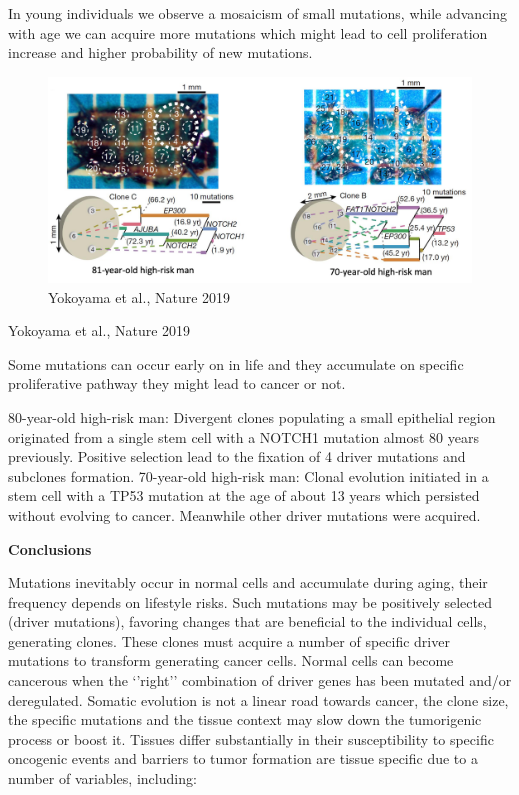In young individuals we observe a mosaicism of small mutations, while advancing with age we can acquire more mutations which might lead to cell proliferation increase and higher probability of new mutations.

\begin{figure}
\centering
\includegraphics{../_resources/Screen_Shot_2022-11-04_at_10-59-51.png}
\caption{Yokoyama et al., Nature 2019}
\end{figure}

Yokoyama et al., Nature 2019

Some mutations can occur early on in life and they accumulate on specific proliferative pathway they might lead to cancer or not.

80-year-old high-risk man: Divergent clones populating a small epithelial region originated from a single stem cell with a NOTCH1 mutation almost 80 years previously. Positive selection lead to the fixation of 4 driver mutations and subclones formation.
70-year-old high-risk man: Clonal evolution initiated in a stem cell with a TP53 mutation at the age of about 13 years which persisted without evolving to cancer. Meanwhile other driver mutations were acquired.

\textbf{Conclusions}

Mutations inevitably occur in normal cells and accumulate during aging, their frequency depends on lifestyle risks. Such mutations may be positively selected (driver mutations), favoring changes that are beneficial to the individual cells, generating clones. These clones must acquire a number of specific driver mutations to transform generating cancer cells. Normal cells can become cancerous when the `'right'' combination of driver genes has been mutated and/or deregulated. Somatic evolution is not a linear road towards cancer, the clone size, the specific mutations and the tissue context may slow down the tumorigenic process or boost it. Tissues differ substantially in their susceptibility to specific oncogenic events and barriers to tumor formation are tissue specific due to a number of variables, including:

